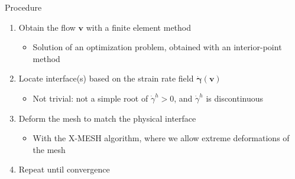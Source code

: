 \documentclass{beamer}  %
\newcommand{\vv}{\mathbf{v}}
\newcommand{\gam}{\boldsymbol{\dot \gamma}}
\begin{document}
\begin{frame}{Procedure}
    \begin{enumerate}
        \setlength{\itemsep}{6pt}
        \item Obtain the flow $\vv$ with a finite element method
        \begin{itemize}
            \item Solution of an optimization problem, obtained with an interior-point method
        \end{itemize}
        \item Locate interface(s) based on the strain rate field $\gam(\vv)$
        \begin{itemize}
            \item Not trivial: not a simple root of $\dot\gamma^h>0$, and $\dot\gamma^h$ is discontinuous
        \end{itemize}
        \item Deform the mesh to match the physical interface
        \begin{itemize}
            \item With the X-MESH algorithm, where we allow extreme deformations of the mesh
        \end{itemize}
        \item Repeat until convergence
    \end{enumerate}
\end{frame}

        
        
    
\end{document}
